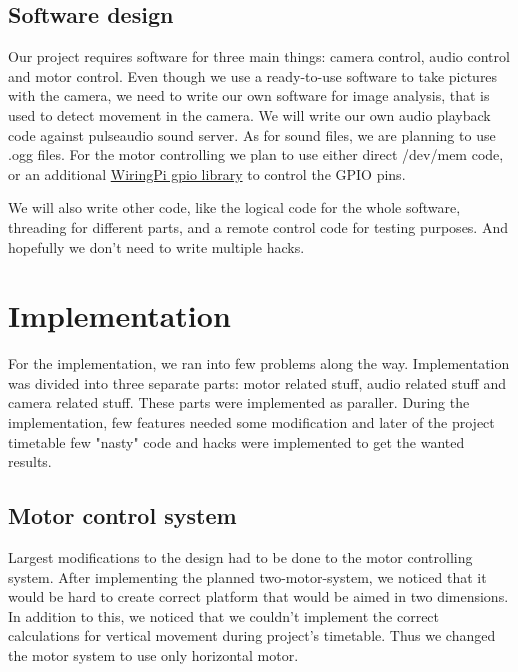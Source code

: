 \documentclass[english,11pt,twoside,a4paper]{article}
\begin{document}
\subsection{Software design}

Our project requires software for three main things: camera control, audio control and motor control. Even though we use a ready-to-use software to take pictures with the camera, we need to write our own software for image analysis, that is used to detect movement in the camera. We will write our own audio playback code against pulseaudio sound server. As for sound files, we are planning to use .ogg files. For the motor controlling we plan to use either direct /dev/mem code, or an additional \href{http://wiringpi.com}{WiringPi gpio library} to control the GPIO pins.

We will also write other code, like the logical code for the whole software, threading for different parts, and a remote control code for testing purposes. And hopefully we don't need to write multiple hacks.

\section{Implementation}

For the implementation, we ran into few problems along the way. Implementation was divided into three separate parts: motor related stuff, audio related stuff and camera related stuff. These parts were implemented as paraller. During the implementation, few features needed some modification and later of the project timetable few "nasty" code and hacks were implemented to get the wanted results.

\subsection{Motor control system}

Largest modifications to the design had to be done to the motor controlling system. After implementing the planned two-motor-system, we noticed that it would be hard to create correct platform that would be aimed in two dimensions. In addition to this, we noticed that we couldn't implement the correct calculations for vertical movement during project's timetable. Thus we changed the motor system to use only horizontal motor.
\end{document}
